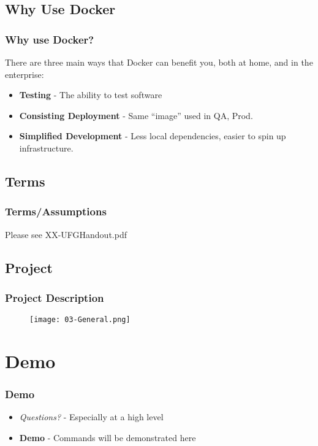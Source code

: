 \documentclass{beamer}
\begin{document}
\subsection{Why Use Docker}
\begin{frame}\frametitle{Why use Docker?}
  There are three main ways that Docker can benefit you, both at home, and in the enterprise:
  \begin{itemize}
  \item \textbf{Testing} - The ability to test software
  \item \textbf{Consisting Deployment} - Same ``image'' used in QA, Prod.
  \item \textbf{Simplified Development} - Less local dependencies, easier to spin up infrastructure.
  \end{itemize}
\end{frame}
\subsection{Terms}
\begin{frame}\frametitle{Terms/Assumptions}
  Please see XX-UFGHandout.pdf
\end{frame}
\subsection{Project}
\begin{frame}\frametitle{Project Description}
  \begin{figure}
    \texttt{[image: 03-General.png]}
  \end{figure}
\end{frame}

\section{Demo}
\begin{frame}\frametitle{Demo}
  \begin{itemize}
    \item \textit{Questions?} - Especially at a high level
    \item \textbf{Demo} - Commands will be demonstrated here
  \end{itemize}
\end{frame}
\end{document}

